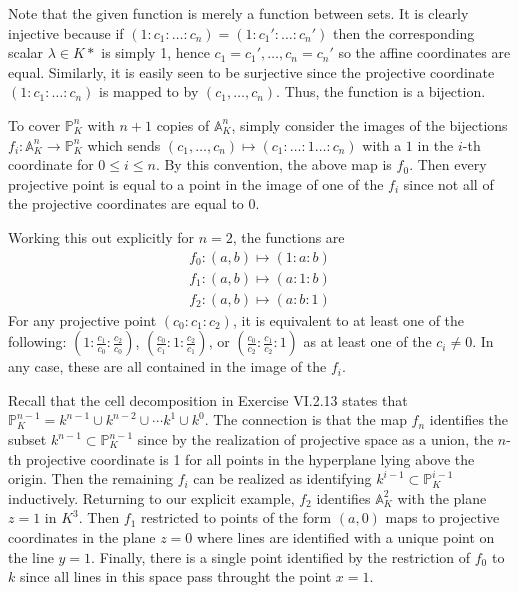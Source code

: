\documentclass[../../master.tex]{subfiles}
\begin{document}
\begin{solution}
    Note that the given function is merely a function between sets.
    It is clearly injective because if $(1 : c_1 : \ldots : c_n) = (1 : c_1' : \ldots : c_n')$ then the corresponding scalar $\lambda \in K*$ is simply 1, hence $c_1 = c_1', \ldots, c_n = c_n'$ so the affine coordinates are equal.
    Similarly, it is easily seen to be surjective since the projective coordinate $(1 : c_1 : \ldots : c_n)$ is mapped to by $(c_1, \ldots, c_n)$.
    Thus, the function is a bijection.
    
    To cover $\mathbb{P}^{n}_K$ with $n + 1$ copies of $\mathbb{A}^{n}_K$, simply consider the images of the bijections $f_i : \mathbb{A}^{n}_K \to \mathbb{P}^{n}_K$ which sends $(c_1, \ldots, c_n) \mapsto (c_1 : \ldots : 1 \ldots : c_n)$ with a $1$ in the $i$-th coordinate for $0 \leq i \leq n$.
    By this convention, the above map is $f_0$.
    Then every projective point is equal to a point in the image of one of the $f_i$ since not all of the projective coordinates are equal to 0.

    Working this out explicitly for $n = 2$, the functions are
    \begin{gather*}
        f_0 : (a, b) \mapsto (1 : a : b) \\
        f_1 : (a, b) \mapsto (a : 1 : b) \\
        f_2 : (a, b) \mapsto (a : b : 1)
    \end{gather*}
    For any projective point $(c_0 : c_1 : c_2)$, it is equivalent to at least one of the following: $(1 : \frac{c_1}{c_0} : \frac{c_2}{c_0})$, $(\frac{c_0}{c_1} : 1 : \frac{c_2}{c_1})$, or $(\frac{c_0}{c_2} : \frac{c_1}{c_2} : 1)$ as at least one of the $c_i \neq 0$.
    In any case, these are all contained in the image of the $f_i$.

    Recall that the cell decomposition in Exercise VI.2.13 states that $\mathbb{P}^{n-1}_K = k^{n-1} \cup k^{n-2} \cup \cdots k^{1} \cup k^{0}$.
    The connection is that the map $f_{n}$ identifies the subset $k^{n-1} \subset \mathbb{P}^{n-1}_K$ since by the realization of projective space as a union, the $n$-th projective coordinate is 1 for all points in the hyperplane lying above the origin.
    Then the remaining $f_{i}$ can be realized as identifying $k^{i-1} \subset \mathbb{P}^{i-1}_K$ inductively.
    Returning to our explicit example, $f_2$ identifies $\mathbb{A}^{2}_K$ with the plane $z = 1$ in $K^3$.
    Then $f_1$ restricted to points of the form $(a, 0)$ maps to projective coordinates in the plane $z = 0$ where lines are identified with a unique point on the line $y = 1$.
    Finally, there is a single point identified by the restriction of $f_0$ to $k$ since all lines in this space pass throught the point $x = 1$.
\end{solution}
\end{document}
